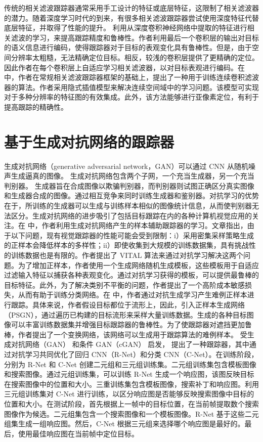 传统的相关滤波跟踪器通常采用手工设计的特征或底层特征，这限制了相关滤波器的潜力。随着深度学习时代的到来，有很多相关滤波跟踪器尝试使用深度特征代替底层特征，并取得了性能的提升。\cite{CF2} 利用从深度卷积神经网络中提取的特征进行相关滤波的学习，来提高跟踪精度和鲁棒性。作者利用最后一个卷积层的输出对目标的语义信息进行编码，使得跟踪器对于目标的表观变化具有鲁棒性。但是，由于空间分辨率太粗糙，无法精确定位目标。相反，较浅的卷积层提供了更精确的定位。因此作者在每个卷积层上自适应学习相关滤波器，以对目标表观进行编码。在 \cite{danelljan2016beyond} 中，作者在常规相关滤波跟踪器框架的基础上，提出了一种用于训练连续卷积滤波器的算法。作者采用隐式插值模型来解决连续空间域中的学习问题。该模型可实现对于多种分辨率的特征图的有效集成。此外，该方法能够进行亚像素定位，有利于提高跟踪的精确性。
\section{基于生成对抗网络的跟踪器}
生成对抗网络（generative adversarial network，GAN）可以通过 CNN 从随机噪声生成逼真的图像。 生成对抗网络包含两个子网，一个充当生成器，另一个充当判别器。 生成器旨在合成图像以欺骗判别器，而判别器则试图正确区分真实图像和生成器合成的图像。通过相互竞争来同时训练生成器和鉴别器。对抗学习的优势在于，所训练的生成器可以生成与训练样本相似的图像统计信息，从而使判别器无法区分。生成对抗网络的进步吸引了包括目标跟踪在内的各种计算机视觉应用的关注。在 \cite{VITAL} 中，作者利用生成对抗网络产生的样本辅助跟踪器的学习。文章指出，由于以下问题，现有视觉跟踪器的性能可能会受到限制：i）采用密集采样策略生成的正样本会降低样本的多样性；ii）即使收集到大规模的训练数据集，具有挑战性的训练数据也是有限的。作者提出了 VITAL 算法来通过对抗学习解决这两个问题。为了增加正样本，作者使用一个生成网络随机生成模板，这些模板用于自适应过滤输入特征以捕获各种表观变化。通过对抗学习获得的模板，可以提供最鲁棒的目标特征。此外，为了解决类别不平衡的问题，作者提出了一个高阶成本敏感损失，从而有助于训练分类网络。在 \cite{SINT++} 中，作者通过对抗生成学习产生难例正样本进行跟踪。具体来说，作者假设目标都位于流形上，因此，引入正样本生成网络（PSGN），通过遍历已构建的目标流形来采样大量训练数据。生成的各种目标图像可以丰富训练数据集并增强目标跟踪器的鲁棒性。为了使跟踪器对遮挡更加鲁棒，作者提出了一个变换网络，该网络可以生成用于跟踪算法的难例样本。%
受生成对抗网络（GAN）\cite{GAN} 和条件 GAN（cGAN）\cite{cGAN} 启发， \cite{AdversarialDeep} 提出了一种跟踪器，其中通过对抗学习共同优化了回归 CNN（R-Net）和分类 CNN（C-Net）。在训练阶段，分别为 R-Net 和 C-Net 创建二元组和三元组训练集。二元组训练集包含模板图像和搜索图像。通过元组训练集，可以训练 R-Net 生成一个响应图，该图反映目标在搜索图像中的位置和大小。三重训练集包含模板图像，搜索补丁和响应图。利用三元组训练集对 C-Net 进行训练，以区分响应图是否能够反映搜索图像中目标的位置和大小。在测试阶段，首先根据上一帧中的目标位置，在当前帧提取数个搜索图像作为候选。二元组集包含一个搜索图像和一个模板图像。R-Net 基于这些二元组集生成一组响应图。然后，C-Net 根据三元组来选择哪个响应图是最好的。最后，使用最佳响应图在当前帧中定位目标。%

